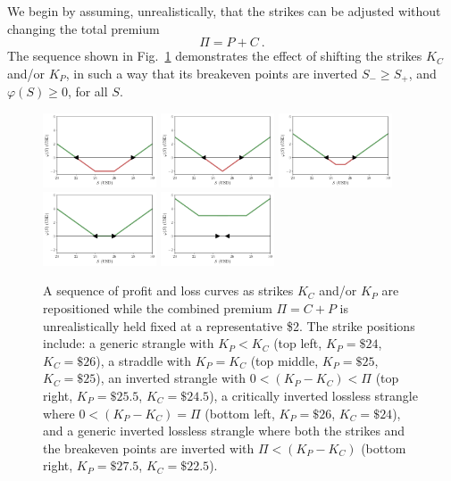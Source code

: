\documentclass[aps,reprint]{revtex4-2}
\begin{document}
We begin by assuming, unrealistically, that the strikes can be adjusted without changing the total premium 
\begin{equation}
\Pi = P + C~.
\end{equation}
The sequence shown in Fig.~\ref{fig:sequence} demonstrates the effect of shifting the strikes $K_C$ and/or $K_P$,  in such a way that 
its breakeven points are inverted $S_- \geq S_+$, and  $\varphi(S) \geq 0$, for all $S$.
\begin{figure}[hb]
    \centering
    \includegraphics[width=0.3\textwidth]{figs/sequence1.pdf}
    \includegraphics[width=0.3\textwidth]{figs/sequence2.pdf}
    \includegraphics[width=0.3\textwidth]{figs/sequence3.pdf}
    \includegraphics[width=0.3\textwidth]{figs/sequence4.pdf}
    \includegraphics[width=0.3\textwidth]{figs/sequence5.pdf}
\caption{
    A sequence of profit and loss curves as strikes $K_C$ and/or $K_P$ are repositioned while the combined premium $\Pi = C+P$ is unrealistically held fixed at a representative \$2. The strike positions include:
    a generic strangle with $K_P < K_C$ (top left, $K_P=\$24$, $K_C=\$26$),
    a straddle with $K_P = K_C$ (top middle, $K_P=\$25$, $K_C=\$25$),
    an inverted strangle with $0 < (K_P - K_C) < \Pi$ (top right, $K_P=\$25.5$, $K_C=\$24.5$),
    a critically inverted lossless strangle where $0 < (K_P - K_C) = \Pi$ (bottom left, $K_P=\$26$, $K_C=\$24$),
    and a generic inverted lossless strangle where both the strikes and the breakeven points are inverted with $\Pi < (K_P - K_C)$ (bottom right, $K_P=\$27.5$, $K_C=\$22.5$).
}
    \label{fig:sequence}
\end{figure}
\end{document}
